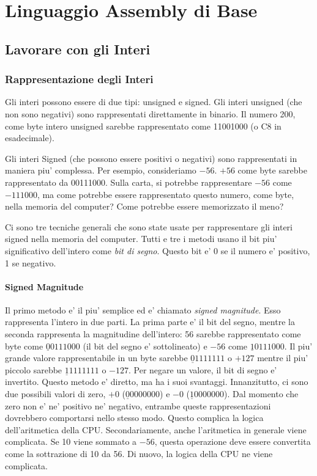 
\chapter{Linguaggio Assembly di Base}

\section{Lavorare con gli Interi }

\subsection{Rappresentazione degli Interi }

Gli interi possono essere di due tipi: unsigned e signed. Gli interi unsigned 
(che non sono negativi) sono rappresentati direttamente in binario. 
Il numero 200, come byte intero unsigned sarebbe rappresentato 
come 11001000 (o C8 in esadecimale).

Gli interi Signed (che possono essere positivi o negativi) sono rappresentati in maniera
piu' complessa. Per esempio, consideriamo $-56$. $+56$ come byte sarebbe 
rappresentato da 00111000. Sulla carta, si potrebbe rappresentare $-56$ come $-111000$,
ma come potrebbe essere rappresentato questo numero, come byte, nella 
memoria del computer? Come potrebbe essere memorizzato il meno?

Ci sono tre tecniche generali che sono state usate per rappresentare gli interi
signed nella memoria del computer. Tutti e tre i metodi usano il bit
piu' significativo dell'intero come \emph{bit di segno}.
Questo bit e' 0 se il numero e' positivo, 1 se negativo.

\subsubsection{Signed Magnitude }

Il primo metodo e' il piu' semplice ed e' chiamato \emph{signed magnitude}. Esso
rappresenta l'intero in due parti. La prima parte e' il bit del segno, mentre la seconda rappresenta la magnitudine dell'intero: 56  sarebbe rappresentato come byte come $\underline{0}0111000$ (il bit del segno e' sottolineato) e $-56$
come $\underline{1}0111000$. Il piu' grande valore rappresentabile in un byte
sarebbe $\underline{0}1111111$ o $+127$ mentre il piu' piccolo sarebbe 
$\underline{1}1111111$ o $-127$. Per negare un valore, il bit di segno e' invertito.
Questo metodo e' diretto, ma ha i suoi svantaggi.
Innanzitutto, ci sono due possibili valori di zero, $+0$ ($\underline{0}0000000$) e
$-0$ ($\underline{1}0000000$). Dal momento che zero non e' ne' positivo ne' negativo,
entrambe queste rappresentazioni dovrebbero comportarsi nello stesso modo.
Questo complica la logica dell'aritmetica della CPU. Secondariamente, anche 
l'aritmetica in generale viene complicata. Se 10 viene sommato a $-56$, questa operazione deve essere convertita come la sottrazione di 10 da 56. Di nuovo, la logica della CPU ne viene 
complicata.

